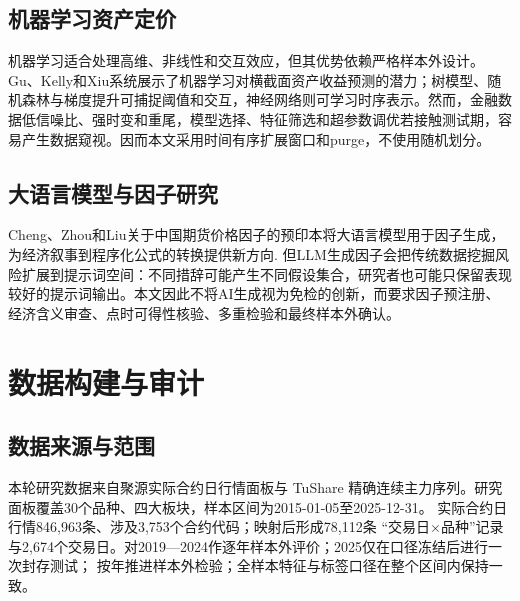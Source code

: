 \documentclass[UTF8,zihao=-4,fontset=ubuntu]{ctexart}
\begin{document}
\subsection{机器学习资产定价}

机器学习适合处理高维、非线性和交互效应，但其优势依赖严格样本外设计。Gu、Kelly和Xiu系统展示了机器学习对横截面资产收益预测的潜力\cite{gkx2020}；树模型、随机森林与梯度提升可捕捉阈值和交互\cite{breiman2001,friedman2001}，神经网络则可学习时序表示。然而，金融数据低信噪比、强时变和重尾，模型选择、特征筛选和超参数调优若接触测试期，容易产生数据窥视。因而本文采用时间有序扩展窗口和purge，不使用随机划分。

\subsection{大语言模型与因子研究}

Cheng、Zhou和Liu关于中国期货价格因子的预印本将大语言模型用于因子生成，为经济叙事到程序化公式的转换提供新方向\cite{cheng2025}. 但LLM生成因子会把传统数据挖掘风险扩展到提示词空间：不同措辞可能产生不同假设集合，研究者也可能只保留表现较好的提示词输出。本文因此不将AI生成视为免检的创新，而要求因子预注册、经济含义审查、点时可得性核验、多重检验和最终样本外确认。

\section{数据构建与审计}

\subsection{数据来源与范围}

本轮研究数据来自聚源实际合约日行情面板与 TuShare 精确连续主力序列。研究面板覆盖30个品种、四大板块，样本区间为2015-01-05至2025-12-31。
实际合约日行情846{,}963条、涉及3{,}753个合约代码；映射后形成78{,}112条
``交易日$\times$品种''记录与2{,}674个交易日。对2019—2024作逐年样本外评价；2025仅在口径冻结后进行一次封存测试；
按年推进样本外检验；全样本特征与标签口径在整个区间内保持一致。
\end{document}
